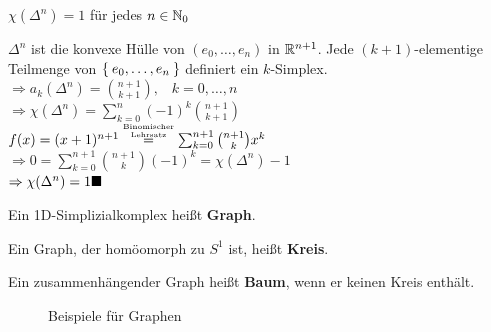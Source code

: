 \begin{bemerkung}
    $\chi(\Delta^n) = 1$ für jedes $n \in \mathbb{N}_0$
\end{bemerkung}

\begin{beweis}
    $\Delta^n$ ist die konvexe Hülle von $(e_0, \dots, e_n)$ in $\mathbb{R}^{n+1}$.
    Jede $(k+1)$-elementige Teilmenge von $\Set{e_0, \dots, e_n}$
    definiert ein $k$-Simplex.\\
    $\Rightarrow a_k(\Delta^n) = \binom{n+1}{k+1}, \;\;\; k = 0, \dots, n$\\
    $\Rightarrow \chi(\Delta^n) = \sum_{k=0}^n (-1)^k \binom{n+1}{k+1}$\\
    $f(x) = (x+1)^{n+1} \overset{\substack{\text{\tiny{Binomischer}}\\\text{\tiny{Lehrsatz}}}}{=} \sum_{k=0}^{n+1} \binom{n+1}{k} x^k$\\
    $\Rightarrow 0 = \sum_{k=0}^{n+1} \binom{n+1}{k} (-1)^k = \chi(\Delta^n) -1$\\
    $\Rightarrow \chi(\Delta^n) = 1 \qed$
\end{beweis}

\begin{definition}%
    \begin{defenum}
        \item Ein 1D-Simplizialkomplex heißt \textbf{Graph}.
        \item Ein Graph, der homöomorph zu $S^1$ ist, heißt \textbf{Kreis}.
        \item Ein zusammenhängender Graph heißt \textbf{Baum},
              wenn er keinen Kreis enthält.
    \end{defenum}
\end{definition}

\begin{figure}[ht]
    \centering

    \subfloat[$K_5$]{
        \parbox[c][3cm]{4cm}{\centering}
        \label{fig:k-5}
    }%
    \subfloat[$K_{3,3}$]{
        \parbox[c][3cm]{4cm}{\centering}
        \label{fig:k-3-3}
    }%
    \label{fig:graphen-beispiele}
    \caption{Beispiele für Graphen}
\end{figure}

